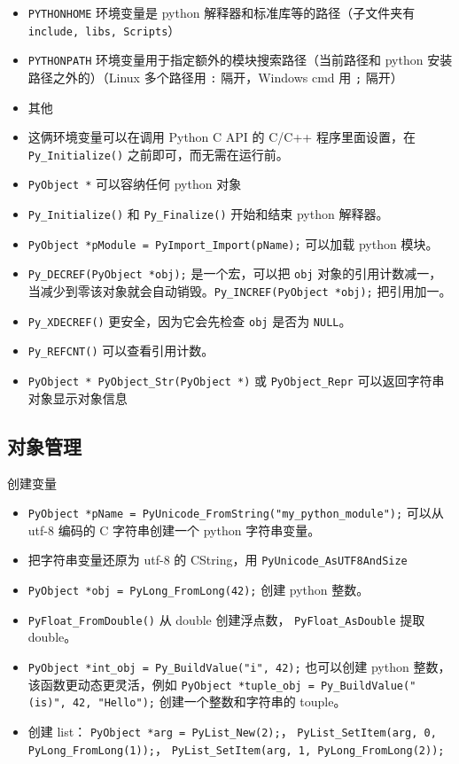 

\begin{itemize}
\item \verb`PYTHONHOME` 环境变量是 python 解释器和标准库等的路径（子文件夹有 \verb`include, libs, Scripts`）
\item \verb`PYTHONPATH` 环境变量用于指定额外的模块搜索路径（当前路径和 python 安装路径之外的）（Linux 多个路径用 \verb`:` 隔开，Windows cmd 用 \verb`;` 隔开）
\item 其他
\item 这俩环境变量可以在调用 Python C API 的 C/C++ 程序里面设置，在 \verb`Py_Initialize()` 之前即可，而无需在运行前。
\item \verb`PyObject *` 可以容纳任何 python 对象
\item \verb`Py_Initialize()` 和 \verb`Py_Finalize()` 开始和结束 python 解释器。
\item \verb`PyObject *pModule = PyImport_Import(pName);` 可以加载 python 模块。
\item \verb`Py_DECREF(PyObject *obj);` 是一个宏，可以把 \verb`obj` 对象的引用计数减一， 当减少到零该对象就会自动销毁。\verb`Py_INCREF(PyObject *obj);` 把引用加一。
\item \verb`Py_XDECREF()` 更安全，因为它会先检查 \verb`obj` 是否为 \verb`NULL`。
\item \verb`Py_REFCNT()` 可以查看引用计数。
\item \verb`PyObject * PyObject_Str(PyObject *)` 或 \verb`PyObject_Repr` 可以返回字符串对象显示对象信息
\end{itemize}

\subsection{对象管理}
创建变量
\begin{itemize}
\item \verb`PyObject *pName = PyUnicode_FromString("my_python_module");` 可以从 utf-8 编码的 C 字符串创建一个 python 字符串变量。
\item 把字符串变量还原为 utf-8 的 CString，用 \verb`PyUnicode_AsUTF8AndSize`
\item \verb`PyObject *obj = PyLong_FromLong(42);` 创建 python 整数。
\item \verb`PyFloat_FromDouble()` 从 double 创建浮点数， \verb`PyFloat_AsDouble` 提取 double。
\item \verb`PyObject *int_obj = Py_BuildValue("i", 42);` 也可以创建 python 整数，该函数更动态更灵活，例如 \verb`PyObject *tuple_obj = Py_BuildValue("(is)", 42, "Hello");` 创建一个整数和字符串的 touple。
\item 创建 list： \verb`PyObject *arg = PyList_New(2);`， \verb`PyList_SetItem(arg, 0, PyLong_FromLong(1));`， \verb`PyList_SetItem(arg, 1, PyLong_FromLong(2));`
\end{itemize}

